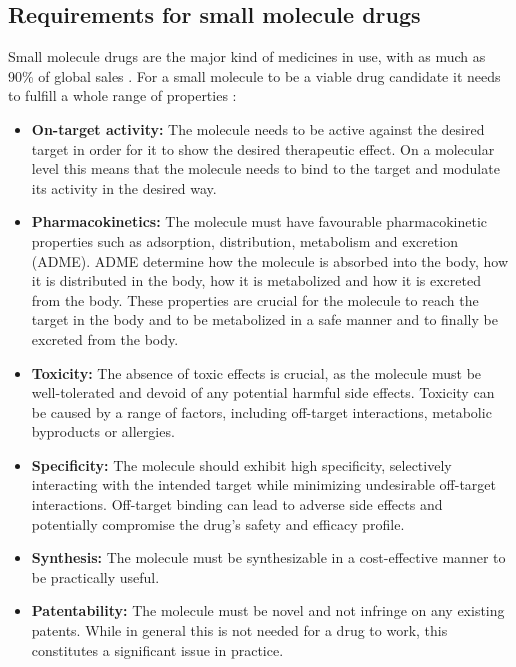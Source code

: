 \subsection{Requirements for small molecule drugs}
Small molecule drugs are the major kind of medicines in use, with as much as
90\% of global sales \citep{makurvetBiologicsVsSmall2021}.
For a small molecule to be a viable drug candidate it needs to fulfill a whole range 
of properties \citep{todo}:
\begin{itemize}
    \item \textbf{On-target activity:} The molecule needs to be active against
    the desired target in order for it to show the desired therapeutic effect.
    On a molecular level this means that the molecule needs to bind to the target
    and modulate its activity in the desired way. 
    \item \textbf{Pharmacokinetics:} The molecule must have favourable
    pharmacokinetic properties such as adsorption, distribution, metabolism and
    excretion (ADME). ADME determine how the molecule is absorbed into the
    body, how it is distributed in the body, how it is metabolized and how it is
    excreted from the body. These properties are crucial for the molecule to
    reach the target in the body and to be metabolized in a safe manner and to 
    finally be excreted from the body.
    \item \textbf{Toxicity:}  The absence of toxic effects is crucial, as the
    molecule must be well-tolerated and devoid of any potential harmful side
    effects. Toxicity can be caused by a range of factors, including off-target
    interactions, metabolic byproducts or allergies.
    \item \textbf{Specificity:}  The molecule should exhibit high specificity,
    selectively interacting with the intended target while minimizing
    undesirable off-target interactions. Off-target binding can lead to adverse
    side effects and potentially compromise the drug's safety and efficacy
    profile.
    \item \textbf{Synthesis:} The molecule must be synthesizable in a
    cost-effective manner to be practically useful.
    \item \textbf{Patentability:} The molecule must be novel and not infringe on
    any existing patents. While in general this is not needed for a drug to work, 
    this constitutes a significant issue in practice.
\end{itemize}

